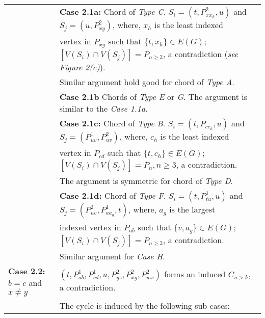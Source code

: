 \documentclass[runningheads]{llncs}
\begin{document}
\begin{table}[H]
\begin{tabular}{|l|l|}
&	\textbf{Case 2.1a:} Chord of \emph{Type C}. $S_i=(t,P_{xx_h}^{2},u)$ and $S_j = (u,P_{xy}^{2})$, where, $x_h$ is the least indexed \\
& vertex in $P_{xy}$ such that $\{t,x_h\} \in E(G)$; $[V(S_i)\cap V(S_j)] = P_{n \geq 3}$, a contradiction (\emph{see Figure 2(c)}). \\
&	Similar argument hold good for chord of \emph{Type A}. \\ \cline{2-2}
&	\textbf{Case 2.1b} Chords of \emph{Type E} or \emph{G}.	The argument is similar to the \emph{Case 1.1a}. \\ \cline{2-2}
&	\textbf{Case 2.1c:} Chord of \emph{Type B}. $S_i=(t,P_{cc_h},u)$ and $S_j=(P_{uv}^{1},P_{uv}^{2})$, where, $c_h$ is the least indexed \\
 & vertex in $P_{cd}$ such that $\{t,c_h\} \in E(G)$; $[V(S_i)\cap V(S_j)] = P_n, n \geq 3$, a contradiction. \\ 
 & The argument is symmetric for chord of \emph{Type D}.\\ \cline{2-2}
 & \textbf{Case 2.1d:} Chord of \emph{Type F}.  $S_i=(t,P_{tu}^{1},u)$ and $S_j=(P_{uv}^{2},P_{aa_g}^{1},t)$, where, $a_g$ is the largest \\
 & indexed vertex in $P_{ab}$ such that $\{v,a_g\} \in E(G)$; $[V(S_i)\cap V(S_j)] = P_{n \geq 3}$, a contradiction.\\ 
 & Similar argument for \emph{Case H}.\\ \hline
\textbf{Case 2.2:} $b= c$ and $x \neq y$ & $(t, P_{ab}^{1}, P_{cd}^{1}, u, P_{yz}^{2}, P_{xy}^{2}, P_{wx}^{2})$ forms an induced $C_{n >k}$, a contradiction. \\ 
&The cycle is induced by the following sub cases:\\ \cline{2-2}


\end{tabular}
\end{table}
\end{document}
